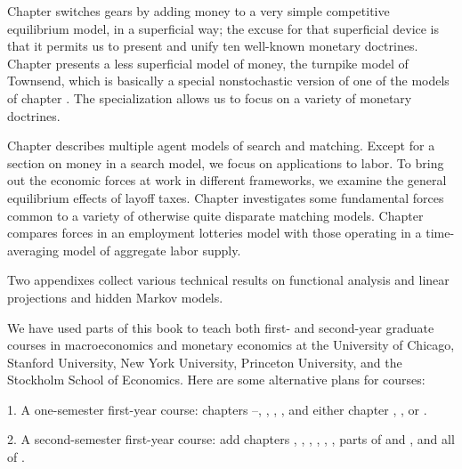  Chapter  switches
gears by adding money to a very simple competitive
equilibrium model, in a superficial way;  the excuse for
that superficial device      is that it permits us
to present  and unify ten  well-known monetary doctrines.
Chapter  presents a less superficial model of
money, the turnpike model of Townsend,
which is basically a special nonstochastic
version of one of the models of chapter .   The specialization
allows us to focus on a variety of monetary doctrines.

Chapter 
 describes multiple agent models of search and matching. Except
for a section on money in a search model, we  focus  on applications to labor.
 To bring
out the economic forces at work in different frameworks,
we examine the general equilibrium effects of layoff taxes.  Chapter  investigates
some fundamental forces common to a variety of otherwise quite disparate matching models.   Chapter 
compares forces in an employment lotteries model with those operating in a time-averaging model
of aggregate labor supply.

  Two appendixes
 collect various technical results on
functional analysis and linear projections and hidden Markov models.

\newpage


 \noindent We have used parts  of  this book to teach both first- and second-year
graduate courses in macroeconomics and monetary economics at the University
of Chicago, Stanford University, New York University, Princeton University, and the
Stockholm School of Economics.  Here are some  alternative plans
for courses:

\medskip
\item{1.} A one-semester first-year course:  chapters
--, , , ,
 and either chapter , , or .

\medskip
\item{2.}  A second-semester first-year course:  add chapters
, , , , ,
,  parts of  and , and all of
.


